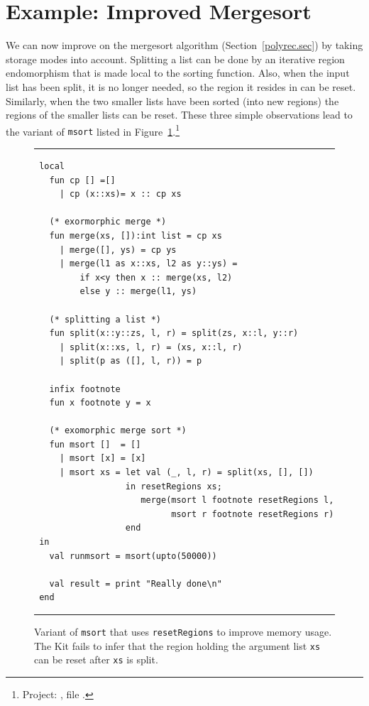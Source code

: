 \documentclass[12pt]{book}
\begin{document}
\section{Example: Improved Mergesort}
\label{improvedmerge.sec}
We can now improve on the 
%
mergesort algorithm (Section~\ref{polyrec.sec}) by taking storage
modes into account. Splitting a list can be done by an iterative
region endomorphism that is made local to the sorting function.  Also,
when the input list has been split, it is no longer needed, so the
region it resides in can be reset. Similarly, when the two smaller
lists have been sorted (into new regions) the regions of the smaller
lists can be reset. These three simple observations lead to the
variant of {\tt msort} listed in
Figure~\ref{msortreset1.fig}.\footnote{Project:
  , file
  .}
\begin{figure}
\hrule
\medskip
\begin{verbatim}
 local
   fun cp [] =[]
     | cp (x::xs)= x :: cp xs

   (* exormorphic merge *)
   fun merge(xs, []):int list = cp xs
     | merge([], ys) = cp ys
     | merge(l1 as x::xs, l2 as y::ys) = 
         if x<y then x :: merge(xs, l2) 
         else y :: merge(l1, ys)

   (* splitting a list *)
   fun split(x::y::zs, l, r) = split(zs, x::l, y::r)
     | split(x::xs, l, r) = (xs, x::l, r)
     | split(p as ([], l, r)) = p

   infix footnote
   fun x footnote y = x

   (* exomorphic merge sort *)
   fun msort []  = []
     | msort [x] = [x]
     | msort xs = let val (_, l, r) = split(xs, [], [])
                  in resetRegions xs;
                     merge(msort l footnote resetRegions l, 
                           msort r footnote resetRegions r)
                  end
 in
   val runmsort = msort(upto(50000))

   val result = print "Really done\n"
 end
\end{verbatim}
\caption{Variant of {\tt msort} that uses {\tt resetRegions} to improve 
  memory usage. The Kit fails to infer that the region holding the
  argument list {\tt xs} can be reset after {\tt xs} is split.}
\label{msortreset1.fig}
\medskip \hrule
\end{figure}
\end{document}
